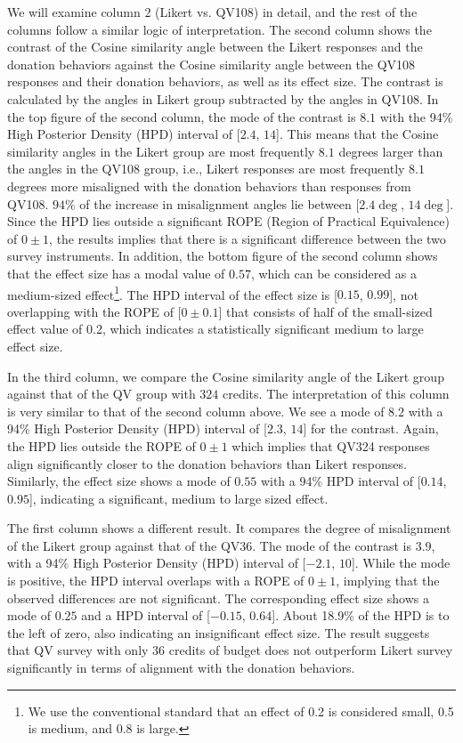 We will examine column $2$ (Likert vs. QV108) in detail, and the rest of the columns follow a similar logic of interpretation. The second column shows the contrast of the Cosine similarity angle between the Likert responses and the donation behaviors against the Cosine similarity angle between the QV108 responses and their donation behaviors, as well as its effect size. The contrast is calculated by the angles in Likert group subtracted by the angles in QV108. In the top figure of the second column, the mode of the contrast is $8.1$ with the 94\% High Posterior Density (HPD) interval of [$2.4$, $14$]. This means that the Cosine similarity angles in the Likert group are most frequently $8.1$ degrees larger than the angles in the QV108 group, i.e., Likert responses are most frequently $8.1$ degrees more misaligned with the donation behaviors than responses from QV108. $94\%$ of the increase in misalignment angles lie between [$2.4 \deg$, $14 \deg$]. Since the HPD lies outside a significant ROPE (Region of Practical Equivalence) of $0 \pm 1$, the results implies that there is a significant difference between the two survey instruments. In addition, the bottom figure of the second column shows that the effect size has a modal value of $0.57$, which can be considered as a medium-sized effect\footnote{We use the conventional standard that an effect of 0.2 is considered small, 0.5 is medium, and 0.8 is large.}. The HPD interval of the effect size is [$0.15$, $0.99$], not overlapping with the ROPE of [$0 \pm 0.1$] that consists of half of the small-sized effect value of 0.2, which indicates a statistically significant medium to large effect size.

In the third column, we compare the Cosine similarity angle of the Likert group
against that of the QV group with $324$ credits. The interpretation of this column is very similar to that of the second column above. We see a mode of $8.2$
with a 94\% High Posterior Density (HPD) interval of [$2.3$, $14$] for the contrast.
Again, the HPD lies outside the ROPE of $0 \pm 1$
which implies that QV324 responses align significantly closer to the donation behaviors than Likert responses. Similarly, the effect size shows a mode of $0.55$ with a 94\% HPD interval of [$0.14$, $0.95$], indicating a significant, medium to large sized effect.

The first column shows a different result. It compares the degree of misalignment of the Likert group against that of the QV36. The mode of the contrast is $3.9$, with a 94\% High Posterior Density (HPD) interval of [$-2.1$, $10$]. While the mode is positive, the HPD interval overlaps with a ROPE of $0 \pm 1$, implying that the observed differences are not significant. The corresponding effect size shows a mode of $0.25$ and a HPD interval of [$-0.15$, $0.64$]. About 18.9\% of the HPD is to the left of zero, also indicating an insignificant effect size. The result suggests that QV survey with only 36 credits of budget does not outperform Likert survey significantly in terms of alignment with the donation behaviors.

